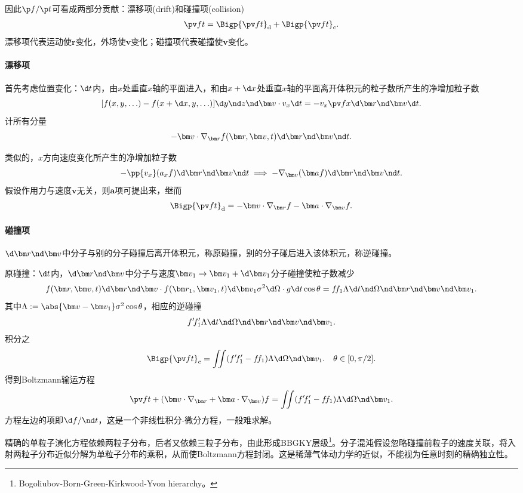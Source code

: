因此$\p f/\p t$可看成两部分贡献：漂移项(drift)和碰撞项(collision)
\begin{align}
	\pv ft=\Bigp{\pv ft}_\df+\Bigp{\pv ft}_\cll.
\end{align}
漂移项代表运动使$\bm r$变化，外场使$\bm v$变化；碰撞项代表碰撞使$\bm v$变化。
\paragraph{漂移项}首先考虑位置变化：$\d t$内，由$x$处垂直$x$轴的平面进入，和由$x+\d x$处垂直$x$轴的平面离开体积元的粒子数所产生的净增加粒子数
\[
	[f(x,y,\ldots)-f(x+\d x,y,\ldots)]\d y\nd z\nd\bm v\cdot v_x\d t=-v_x\pv fx\d\bm r\nd\bm v\d t.
\]
计所有分量
\[
	-\bm v\cdot\nabla_{\bm r}f(\bm r,\bm v,t)\d\bm r\nd\bm v\nd t.
\]

类似的，$x$方向速度变化所产生的净增加粒子数
\[
	-\pp{v_x}(a_xf)\d\bm r\nd\bm v\nd t\implies-\nabla_{\bm v}(\bm af)\d\bm r\nd\bm v\nd t.
\]
假设作用力与速度$\bm v$无关，则$\bm a$项可提出来，继而
\begin{align}
	\Bigp{\pv ft}_\df=-\bm v\cdot\nabla_{\bm r}f-\bm a\cdot\nabla_{\bm v}f.
\end{align}
\paragraph{碰撞项}$\d\bm r\nd\bm v$中分子与别的分子碰撞后离开体积元，称原碰撞，别的分子碰后进入该体积元，称逆碰撞。

原碰撞：$\d t$内，$\d\bm r\nd\bm v$中分子与速度$\bm v_1\to\bm v_1+\d\bm v_1$分子碰撞使粒子数减少
\[
	f(\bm r,\bm v,t)\d\bm r\nd\bm v\cdot f(\bm r_1,\bm v_1,t)\d\bm v_1\sigma^2\d\Omega\cdot g\d t\cos\theta=f\!f_1\Lambda\d t\nd\Omega\nd\bm r\nd\bm v\nd\bm v_1.
\]
其中$\Lambda:=\abs{\bm v-\bm v_1}\sigma^2\cos\theta$，相应的逆碰撞
\[
	f'\!f_1'\Lambda\d t\nd\Omega\nd\bm r\nd\bm v\nd\bm v_1.
\]
积分之
\begin{align}
	\Bigp{\pv ft}_\cll=\iint(f'\!f_1'-f\!f_1)\Lambda\d\Omega\nd\bm v_1.\quad\theta\in[0,\pi/2].
\end{align}
得到Boltzmann输运方程
\begin{align}
	\pv ft+(\bm v\cdot\nabla_{\bm r}+\bm a\cdot\nabla_{\bm v})f=\iint(f'\!f_1'-f\!f_1)\Lambda\d\Omega\nd\bm v_1.
\end{align}
方程左边的项即$\d f/\nd t$，这是一个非线性积分-微分方程，一般难求解。

精确的单粒子演化方程依赖两粒子分布，后者又依赖三粒子分布，由此形成BBGKY层级\footnote{Bogoliubov-Born-Green-Kirkwood-Yvon hierarchy。}。分子混沌假设忽略碰撞前粒子的速度关联，将入射两粒子分布近似分解为单粒子分布的乘积，从而使Boltzmann方程封闭。这是稀薄气体动力学的近似，不能视为任意时刻的精确独立性。
